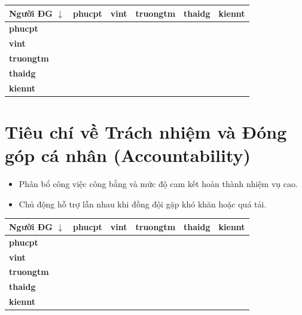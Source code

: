 \documentclass[12pt,a4paper]{article}
\begin{document}
\begin{table}[H]
\centering
\renewcommand{\arraystretch}{1.15}
\begin{tabularx}{\textwidth}{|>{\centering\arraybackslash}X|>{\centering\arraybackslash}X|>{\centering\arraybackslash}X|>{\centering\arraybackslash}X|>{\centering\arraybackslash}X|>{\centering\arraybackslash}X|}
\hline
\rowcolor{gray!15} \textbf{Người ĐG $\downarrow$} & \textbf{phucpt} & \textbf{vint} & \textbf{truongtm} & \textbf{thaidg} & \textbf{kiennt} \\ \hline
\textbf{phucpt} &  &  &  &  &  \\ \hline
\textbf{vint} &  &  &  &  &  \\ \hline
\textbf{truongtm} &  &  &  &  &  \\ \hline
\textbf{thaidg} &  &  &  &  &  \\ \hline
\textbf{kiennt} &  &  &  &  &  \\ \hline
\end{tabularx}
\end{table}

\section*{Tiêu chí về Trách nhiệm và Đóng góp cá nhân (Accountability)}
\begin{itemize}[itemsep=0pt, parsep=0pt]
    \item Phân bổ công việc công bằng và mức độ cam kết hoàn thành nhiệm vụ cao.
    \item Chủ động hỗ trợ lẫn nhau khi đồng đội gặp khó khăn hoặc quá tải.
\end{itemize}

\begin{table}[H]
\centering
\renewcommand{\arraystretch}{1.15}
\begin{tabularx}{\textwidth}{|>{\centering\arraybackslash}X|>{\centering\arraybackslash}X|>{\centering\arraybackslash}X|>{\centering\arraybackslash}X|>{\centering\arraybackslash}X|>{\centering\arraybackslash}X|}
\hline
\rowcolor{gray!15} \textbf{Người ĐG $\downarrow$} & \textbf{phucpt} & \textbf{vint} & \textbf{truongtm} & \textbf{thaidg} & \textbf{kiennt} \\ \hline
\textbf{phucpt} &  &  &  &  &  \\ \hline
\textbf{vint} &  &  &  &  &  \\ \hline
\textbf{truongtm} &  &  &  &  &  \\ \hline
\textbf{thaidg} &  &  &  &  &  \\ \hline
\textbf{kiennt} &  &  &  &  &  \\ \hline
\end{tabularx}
\end{table}
\end{document}
